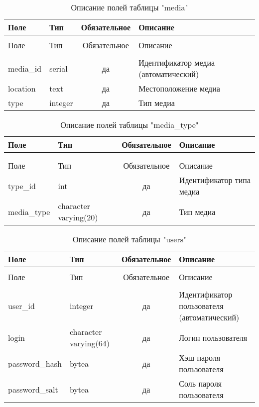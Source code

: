 \begin{xltabular}{\textwidth}{|l|l|c|X|}
	\caption{Описание полей таблицы "media"\label{media:table}} \hline
	Поле & Тип & Обязательное & Описание \\ \hline
	 &  &  & \\ \hline
	\endfirsthead
	 \hline
	Поле & Тип & Обязательное & Описание \\ \hline
	 &  &  & \\ \hline
	\endhead
	media\_id & serial & да & Идентификатор медиа (автоматический) \\ \hline
	location & text & да & Местоположение медиа \\ \hline
	type & integer & да & Тип медиа \\ \hline
\end{xltabular}

\begin{xltabular}{\textwidth}{|l|l|c|X|}
	\caption{Описание полей таблицы "media\_type"\label{media_type:table}} \hline
	Поле & Тип & Обязательное & Описание \\ \hline
	 &  &  & \\ \hline
	\endfirsthead
	  &  &  & \\ \hline
	\endhead
	Поле & Тип & Обязательное & Описание \\ \hline
	\endhead
	type\_id & int & да & Идентификатор типа медиа \\ \hline
	media\_type & character varying(20) & да & Тип медиа \\ \hline
\end{xltabular}

\begin{xltabular}{\textwidth}{|l|l|c|X|}
	\caption{Описание полей таблицы "users"\label{users:table}} \hline
	Поле & Тип & Обязательное & Описание \\ \hline
	 &  &  & \\ \hline
	\endfirsthead
	 \hline
	Поле & Тип & Обязательное & Описание \\ \hline
	 &  &  & \\ \hline
	\endhead
	user\_id & integer & да & Идентификатор пользователя (автоматический) \\ \hline
	login & character varying(64) & да & Логин пользователя \\ \hline
	password\_hash & bytea & да & Хэш пароля пользователя \\ \hline
	password\_salt & bytea & да & Соль пароля пользователя \\ \hline
\end{xltabular}

